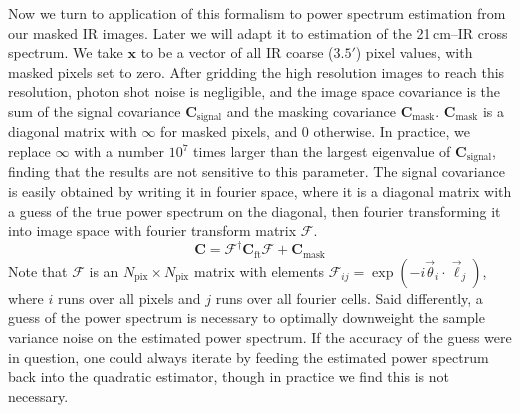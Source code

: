 \documentclass[numberedappendix]{emulateapj}
\newcommand{\Cb}{\mathbf{C}}
\newcommand{\xb}{\mathbf{x}}
\begin{document}
Now we turn to application of this formalism to power spectrum estimation from our masked IR images. Later we will adapt it to estimation of the 21\,cm--IR cross spectrum. We take $\xb$ to be a vector of all IR coarse ($3.5'$) pixel values, with masked pixels set to zero. After gridding the high resolution images to reach this resolution, photon shot noise is negligible, and the image space covariance is the sum of the signal covariance $\Cb_\text{signal}$ and the masking covariance $\Cb_\text{mask}$. $\Cb_\text{mask}$ is a diagonal matrix with $\infty$ for masked pixels, and 0 otherwise. In practice, we replace $\infty$ with a number $10^7$ times larger than the largest eigenvalue of $\Cb_\text{signal}$, finding that the results are not sensitive to this parameter. The signal covariance is easily obtained by writing it in fourier space, where it is a diagonal matrix with a guess of the true power spectrum on the diagonal, then fourier transforming it into image space with fourier transform matrix $\mathcal{F}$. 
\begin{equation}
\label{eqn:covFTwithmask}
	\Cb = \mathcal{F}^\dagger\Cb_\text{ft}\mathcal{F}+\Cb_\text{mask}
\end{equation}
Note that $\mathcal{F}$ is an $N_\text{pix}\times N_\text{pix}$ matrix with elements $\mathcal{F}_{ij}=\exp(-i \vec{\theta}_i\cdot\vec{\ell}_j)$, where $i$ runs over all pixels and $j$ runs over all fourier cells. Said differently, a guess of the power spectrum is necessary to optimally downweight the sample variance noise on the estimated power spectrum. If the accuracy of the guess were in question, one could always iterate by feeding the estimated power spectrum back into the quadratic estimator, though in practice we find this is not necessary. 
\end{document}
